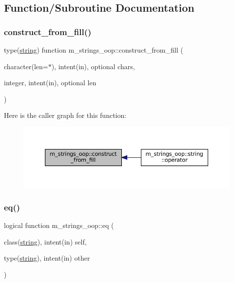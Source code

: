 \subsection{Function/\+Subroutine Documentation}
\mbox{\label{namespacem__strings__oop_a411874cce2f16fee4d05d7528b510703}} 
\subsubsection{\texorpdfstring{construct\+\_\+from\+\_\+fill()}{construct\_from\_fill()}}
{\footnotesize\ttfamily type(\mbox{\hyperlink{structm__strings__oop_1_1string}{string}}) function m\+\_\+strings\+\_\+oop\+::construct\+\_\+from\+\_\+fill (\begin{DoxyParamCaption}\item[{character(len=$\ast$), intent(in), optional}]{chars,  }\item[{integer, intent(in), optional}]{len }\end{DoxyParamCaption})\hspace{0.3cm}{\ttfamily [private]}}

Here is the caller graph for this function\+:\nopagebreak
\begin{figure}[H]
\begin{center}
\leavevmode
\includegraphics[width=350pt]{namespacem__strings__oop_a411874cce2f16fee4d05d7528b510703_icgraph}
\end{center}
\end{figure}
\mbox{\label{namespacem__strings__oop_a2e5c8d9117609e553db07a1eba18b1fa}} 
\subsubsection{\texorpdfstring{eq()}{eq()}}
{\footnotesize\ttfamily logical function m\+\_\+strings\+\_\+oop\+::eq (\begin{DoxyParamCaption}\item[{class(\mbox{\hyperlink{structm__strings__oop_1_1string}{string}}), intent(in)}]{self,  }\item[{type(\mbox{\hyperlink{structm__strings__oop_1_1string}{string}}), intent(in)}]{other }\end{DoxyParamCaption})\hspace{0.3cm}{\ttfamily [private]}}

